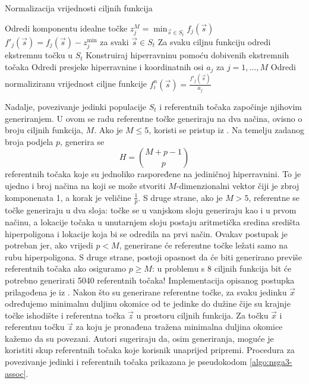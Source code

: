 \documentclass[times, utf8, zavrsni, numeric]{fer}
\begin{document}
\begin{algorithm}
\caption{Normalizacija vrijednosti ciljnih funkcija}
\label{algo:nsga3-norm}
\begin{algorithmic}
\STATE Odredi komponentu idealne točke $z_j^M = \min_{\vec{s} \in S_t}f_j(\vec{s})$
\STATE $f'_j(\vec{s}) = f_j(\vec{s}) - z_j^{\min}$ za svaki $\vec{s} \in S_t$
\ENDFOR
\STATE Za svaku ciljnu funkciju odredi ekstremnu točku u $S_t$
\STATE Konstruiraj hiperravninu pomoću dobivenih ekstremnih točaka
\STATE Odredi presjeke hiperravnine i koordinatnih osi $a_j$ za $j = 1, \dots, M$
\STATE Odredi normaliziranu vrijednost ciljne funkcije $f_i^n(\vec{s}) = \frac{f'_j(\vec{s})}{a_j}$  
\ENDFOR
\ENDFOR
\end{algorithmic}
\end{algorithm}

Nadalje, povezivanje jedinki populacije $S_t$ i referentnih točaka započinje njihovim generiranjem. U ovom se radu referentne točke generiraju na dva načina, ovisno o broju ciljnih funkcija, $M$. Ako je $M \leq 5$, koristi se pristup iz \citep{das_dennis}. Na temelju zadanog broja podjela $p$, generira se
\begin{equation*}
H = \binom{M + p - 1}{p}
\end{equation*}  
referentnih točaka koje su jednoliko raspoređene na jediničnoj hiperravnini. To je ujedno i broj načina na koji se može stvoriti $M$-dimenzionalni vektor čiji je zbroj komponenata 1, a korak je veličine $\frac{1}{p}$. S druge strane, ako je $M > 5$, referentne se točke generiraju u dva sloja: točke se u vanjskom sloju generiraju kao i u prvom načinu, a lokacije točaka u unutarnjem sloju postaju aritmetička sredina središta hiperpoligona i lokacije koja bi se odredila na prvi način. Ovakav postupak je potreban jer, ako vrijedi $p < M$, generirane će referentne točke ležati samo na rubu hiperpoligona. S druge strane, postoji opasnost da će biti generirano previše referentnih točaka ako osiguramo $p \geq M$: u problemu s 8 ciljnih funkcija bit će potrebno generirati 5040 referentnih točaka! Implementacija opisanog postupka prilagođena je iz \citep{nsga3_impl}. Nakon što su generirane referentne točke, za svaku jedinku $\vec{x}$ određujemo minimalnu duljinu okomice od te jedinke do dužine čije su krajnje točke ishodište i referentna točka $\vec{z}$ u prostoru ciljnih funkcija. Za točku $\vec{x}$ i referentnu točku $\vec{z}$ za koju je pronađena tražena minimalna duljina okomice kažemo da su povezani. Autori sugeriraju da, osim generiranja, moguće je koristiti skup referentnih točaka koje korisnik unaprijed pripremi. 
Procedura za povezivanje jedinki i referentnih točaka prikazana je pseudokodom \ref{algo:nsga3-assoc}.\\
\end{document}
